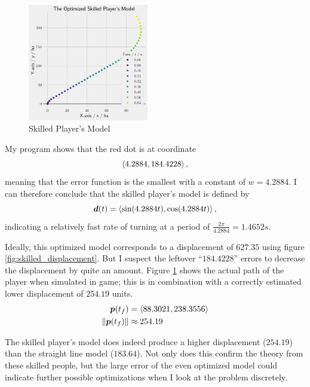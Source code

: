 \begin{figure}
    \includegraphics[width=0.47\textwidth,right]{assets/skilled_player.png}
    \caption{Skilled Player's Model}
    \label{fig:skilled_player}
\end{figure}

My program shows that the red dot is at coordinate
\[
    \left\langle 4.2884, 184.4228 \right\rangle,
\]
meaning that the error function is the smallest with a constant of $w=4.2884$. I can therefore conclude that the skilled player's model is defined by
\[
    \boldsymbol{d}(t) = \left\langle \sin(4.2884t), \cos(4.2884t) \right\rangle,
\]
indicating a relatively fast rate of turning at a period of $\frac{2\pi}{4.2884} = 1.4652\si{s}$.


Ideally, this optimized model corresponds to a displacement of $627.35$ using figure \ref{fig:skilled_displacement}. But I suspect the leftover ``$184.4228$'' errors to decrease the displacement by quite an amount. Figure \ref{fig:skilled_player} shows the actual path of the player when simulated in game; this is in combination with a correctly estimated lower displacement of $254.19$ units.
\begin{align*}
    \boldsymbol{p}(t_f) &= \left\langle 88.3021, 238.3556 \right\rangle\\
    \|\boldsymbol{p}(t_f)\| &\approx 254.19
\end{align*}

The skilled player's model does indeed produce a higher displacement ($254.19$) than the straight line model ($183.64$). Not only does this confirm the theory from these skilled people, but the large error of the even optimized model could indicate further possible optimizations when I look at the problem discretely.
